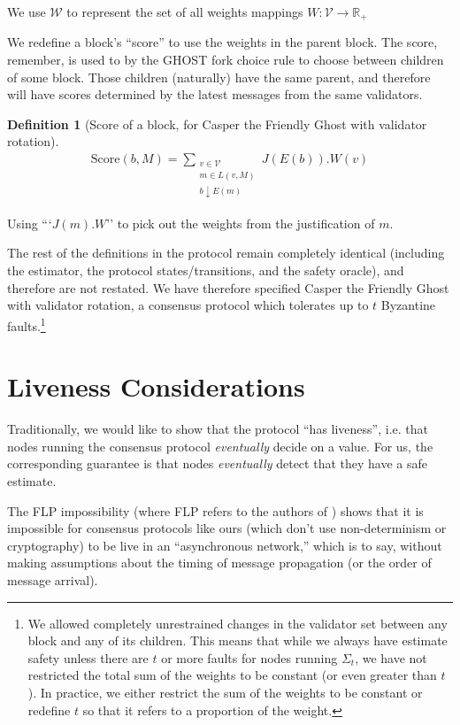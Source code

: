\documentclass{article}
\theoremstyle{definition}
\newtheorem{defn}{Definition}[section]
\begin{document}
We use $\mathcal{W}$ to represent the set of all weights mappings $W:\mathcal{V} \to \mathbb{R}_+$

We redefine a block's ``score'' to use the weights in the parent block. The score, remember, is used to by the GHOST fork choice rule to choose between children of some block. Those children (naturally) have the same parent, and therefore will have scores determined by the latest messages from the same validators.

\begin{defn}[Score of a block, for Casper the Friendly Ghost with validator rotation]
\begin{align}
\text{Score}(b, M) = \sum_{\substack{v \in \mathcal{V} \\ m \in L(v,M) \\ b \downarrow E(m)}} J(E(b)).W(v)
\end{align}
\end{defn}

Using ```$J(m).W$'' to pick out the weights from the justification of $m$.

The rest of the definitions in the protocol remain completely identical (including the estimator, the protocol states/transitions, and the safety oracle), and therefore are not restated. We have therefore specified Casper the Friendly Ghost with validator rotation, a consensus protocol which tolerates up to $t$ Byzantine faults.\footnote{We allowed completely unrestrained changes in the validator set between any block and any of its children. This means that while we always have estimate safety unless there are $t$ or more faults for nodes running $\Sigma_t$, we have not restricted the total sum of the weights to be constant (or even greater than $t$). In practice, we either restrict the sum of the weights to be constant or redefine $t$ so that it refers to a proportion of the weight.}


\section{Liveness Considerations}

Traditionally, we would like to show that the protocol ``has liveness'', i.e. that nodes running the consensus protocol \emph{eventually} decide on a value. For us, the corresponding guarantee is that nodes \emph{eventually} detect that they have a safe estimate.

The FLP impossibility (where FLP refers to the authors of \cite{Fischer_Lynch_Paterson_FLP_Impossibility_1985}) shows that it is impossible for consensus protocols like ours (which don't use non-determinism or cryptography) to be live in an ``asynchronous network,'' which is to say, without making assumptions about the timing of message propagation (or the order of message arrival).
\end{document}

